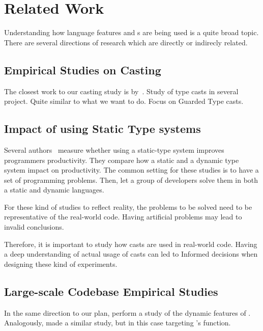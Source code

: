 
\chapter{Related Work}

Understanding how language features and \api{}s are being used is a quite broad topic.
There are several directions of research which are directly or indirecly related.

\section{Empirical Studies on Casting}

The closest work to our casting study is by~\cite{Winther:2011:GTP:2076674.2076680}.
Study of type casts in several project.
Quite similar to what we want to do.
Focus on Guarded Type casts.


\section{Impact of using Static Type systems}

Several authors~\cite{Stuchlik:2011:SVD:2047849.2047861,Mayer:2012:ESI:2384616.2384666,7911881} measure whether using a static-type system improves programmers productivity.
They compare how a static and a dynamic type system impact on productivity.
The common setting for these studies is to have a set of programming problems.
Then, let a group of developers solve them in both a static and dynamic languages.

For these kind of studies to reflect reality, the problems to be solved need to
be representative of the real-world code.
Having artificial problems may lead to invalid conclusions.

Therefore, it is important to study how casts are used in real-world code.
Having a deep understanding of actual usage of casts can led to
Informed decisions when designing these kind of experiments.

\section{Large-scale Codebase Empirical Studies}

In the same direction to our plan, \cite{Callau:2011:DUD:1985441.1985448} perform a study of the dynamic features of \smalltalk{}.
Analogously, \cite{Richards:2011:EML:2032497.2032503} made a similar study, but in this case targeting \javascript{}'s \eval{} function.


